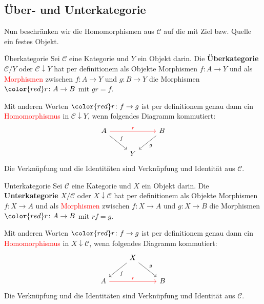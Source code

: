 \documentclass[a4paper]{amsart}
\theoremstyle{definition}
\begin{document}
\subsection{Über- und Unterkategorie}
Nun beschränken wir die Homomorphismen aus $\mathcal C$ auf die mit Ziel bzw. Quelle ein festes Objekt.

\begin{Definition}{Überkategorie}
   Sei $\mathcal C$ eine Kategorie und $Y$ ein Objekt darin. Die \textbf{Überkategorie}
   $\mathcal C / Y$ oder  $\mathcal C \downarrow Y$ hat per definitionem als Objekte Morphismen $f \colon A \to Y$ und als \textcolor{red}{Morphismen} zwischen $f \colon A \to Y$ und $g \colon B \to Y$ die Morphismen $\color{red}r \colon A \to B$ mit $gr = f$.
   
   Mit anderen Worten $\color{red}r \colon f \to g$ ist per definitionem genau dann ein \textcolor{red}{Homomorphismus} in 
   $\mathcal C \downarrow Y$, wenn folgendes Diagramm kommutiert:
   \begin{equation*}
      \begin{tikzcd}
         A   \arrow[rd, "f"] \arrow[rr, red, "r"]  &   & B \arrow[ld, "g"]\\
                              & Y
      \end{tikzcd}
   \end{equation*}
   Die Verknüpfung und die Identitäten sind Verknüpfung und Identität aus $\mathcal C$.
\end{Definition}

\begin{Definition}{Unterkategorie}
   Sei $\mathcal C$ eine Kategorie und $X$ ein Objekt darin. Die \textbf{Unterkategorie}
   $X / \mathcal C$ oder  $X \downarrow \mathcal C$ hat per definitionem als Objekte Morphismen $f \colon X \to A$ und als \textcolor{red}{Morphismen} zwischen $f \colon X \to A$ und $g \colon X \to B$ die Morphismen $\color{red}r \colon A \to B$ mit $rf = g$.
   
   Mit anderen Worten $\color{red}r \colon f \to g$ ist per definitionem genau dann ein \textcolor{red}{Homomorphismus} in 
   $X \downarrow \mathcal C$, wenn folgendes Diagramm kommutiert:
   \begin{equation*}
      \begin{tikzcd}
                                 & X \arrow[ld, "f"] \arrow[rd, "g"] \\
         A \arrow[rr, red, "r"]  &                                     & B 
      \end{tikzcd}
   \end{equation*}
   Die Verknüpfung und die Identitäten sind Verknüpfung und Identität aus $\mathcal C$.
\end{Definition}
\end{document}

